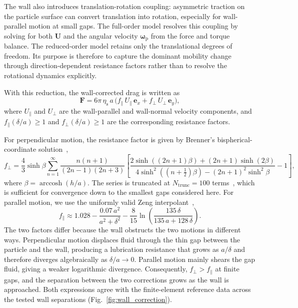 \documentclass{elsarticle}
\renewcommand{\vec}[1]{\boldsymbol{#1}}
\begin{document}
The wall also introduces translation-rotation coupling: asymmetric
traction on the particle surface can convert translation into rotation,
especially for wall-parallel motion at small gaps. The full-order model
resolves this coupling by solving for both $\vec{U}$ and the angular
velocity $\vec{\omega}_{\mathrm{p}}$ from the force and torque balance.
The reduced-order model retains only the translational degrees of
freedom. Its purpose is therefore to capture the dominant mobility
change through direction-dependent resistance factors rather than to
resolve the rotational dynamics explicitly.

With this reduction, the wall-corrected drag is written as
\begin{equation}
\vec{F}
= 6\pi\,\eta_{\mathrm{s}}\,a\,
  \bigl(f_{\parallel}\,U_{\parallel}\,\vec{e}_x
  + f_{\perp}\,U_{\perp}\,\vec{e}_y\bigr),
\label{eq:modified_stokes_drag}
\end{equation}
where $U_{\parallel}$ and $U_{\perp}$ are the wall-parallel and
wall-normal velocity components, and
$f_{\parallel}(\delta/a)\ge1$ and $f_{\perp}(\delta/a)\ge1$ are the
corresponding resistance factors.

For perpendicular motion, the resistance factor is given by Brenner's
bispherical-coordinate solution~\cite{brenner1961slow},
\begin{equation}
f_{\perp}
= \dfrac{4}{3}\sinh\beta
\sum_{n=1}^{\infty}
\dfrac{n(n+1)}{(2n-1)(2n+3)}
\left[
\dfrac{2\sinh((2n+1)\beta) + (2n+1)\sinh(2\beta)}
     {4\sinh^{2}((n+\frac{1}{2})\beta) - (2n+1)^{2}\sinh^{2}\beta}
- 1\right],
\label{eq:brenner}
\end{equation}
where $\beta=\operatorname{arccosh}(h/a)$. The series is truncated at
$N_{\mathrm{trunc}}=100$ terms~\cite{nguyen2021multi}, which is
sufficient for convergence down to the smallest gaps considered here.
For parallel motion, we use the uniformly valid Zeng
interpolant~\cite{zeng2009forces,loth2023fluid},
\begin{equation}
f_{\parallel}\approx
1.028 - \dfrac{0.07\,a^{2}}{a^{2}+\delta^{2}}
- \dfrac{8}{15}\ln\!\left(\dfrac{135\,\delta}{135\,a + 128\,\delta}\right).
\label{eq:f_parallel_zeng}
\end{equation}
The two factors differ because the wall obstructs the two motions in
different ways. Perpendicular motion displaces fluid through the thin gap
between the particle and the wall, producing a lubrication resistance
that grows as $a/\delta$ and therefore diverges algebraically as
$\delta/a\to0$. Parallel motion mainly shears the gap fluid, giving a
weaker logarithmic divergence. Consequently,
$f_{\perp}>f_{\parallel}$ at finite gaps, and the separation between the
two corrections grows as the wall is approached. Both expressions agree
with the finite-element reference data across the tested wall
separations (Fig.~\ref{fig:wall_correction}).
\end{document}
